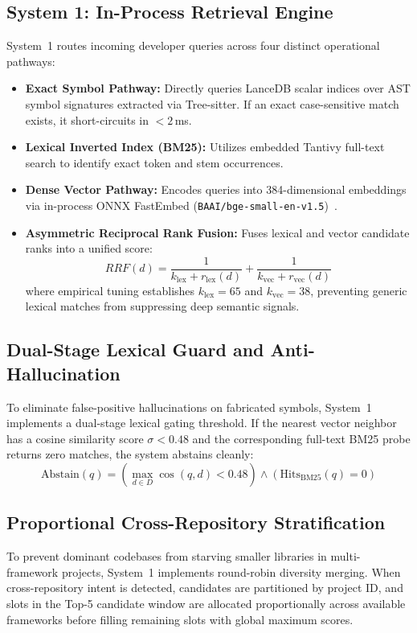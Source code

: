 \documentclass[10pt,journal,compsoc]{IEEEtran}
\begin{document}
\subsection{System 1: In-Process Retrieval Engine}
System~1 routes incoming developer queries across four distinct operational pathways:
\begin{itemize}
    \item \textbf{Exact Symbol Pathway:} Directly queries LanceDB scalar indices over AST symbol signatures extracted via Tree-sitter. If an exact case-sensitive match exists, it short-circuits in $<2$\,ms.
    \item \textbf{Lexical Inverted Index (BM25):} Utilizes embedded Tantivy full-text search to identify exact token and stem occurrences.
    \item \textbf{Dense Vector Pathway:} Encodes queries into 384-dimensional embeddings via in-process ONNX FastEmbed (\texttt{BAAI/bge-small-en-v1.5})~\cite{bge2023}.
    \item \textbf{Asymmetric Reciprocal Rank Fusion:} Fuses lexical and vector candidate ranks into a unified score:
    \begin{equation}
        RRF(d) = \frac{1}{k_{\text{lex}} + r_{\text{lex}}(d)} + \frac{1}{k_{\text{vec}} + r_{\text{vec}}(d)}
    \end{equation}
    where empirical tuning establishes $k_{\text{lex}} = 65$ and $k_{\text{vec}} = 38$, preventing generic lexical matches from suppressing deep semantic signals.
\end{itemize}

\subsection{Dual-Stage Lexical Guard and Anti-Hallucination}
To eliminate false-positive hallucinations on fabricated symbols, System~1 implements a dual-stage lexical gating threshold. If the nearest vector neighbor has a cosine similarity score $\sigma < 0.48$ and the corresponding full-text BM25 probe returns zero matches, the system abstains cleanly:
\begin{equation}
    \text{Abstain}(q) = \left( \max_{d \in D} \cos(q, d) < 0.48 \right) \land \left( \text{Hits}_{\text{BM25}}(q) = 0 \right)
\end{equation}

\subsection{Proportional Cross-Repository Stratification}
To prevent dominant codebases from starving smaller libraries in multi-framework projects, System~1 implements round-robin diversity merging. When cross-repository intent is detected, candidates are partitioned by project ID, and slots in the Top-5 candidate window are allocated proportionally across available frameworks before filling remaining slots with global maximum scores.
\end{document}
